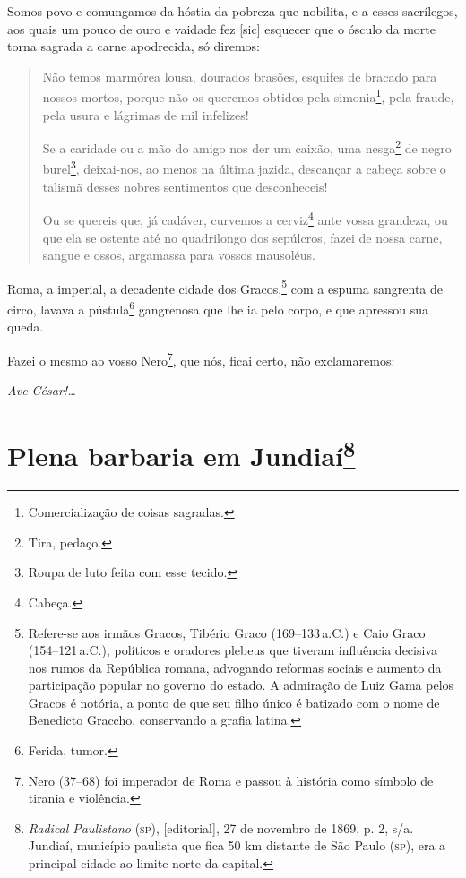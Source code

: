 Somos povo e comungamos da hóstia da pobreza que nobilita, e a esses
sacrílegos, aos quais um pouco de ouro e vaidade fez {[}sic{]} esquecer
que o ósculo da morte torna sagrada a carne apodrecida, só diremos:

\begin{quote}
Não temos marmórea lousa, dourados brasões, esquifes de bracado para
nossos mortos, porque não os queremos obtidos pela simonia\footnote{
  Comercialização de coisas sagradas.}, pela fraude, pela usura e
lágrimas de mil infelizes!

Se a caridade ou a mão do amigo nos der um caixão, uma nesga\footnote{
  Tira, pedaço.} de negro burel\footnote{Roupa de luto feita com esse
  tecido.}, deixai-nos, ao menos na última jazida, descançar a cabeça
sobre o talismã desses nobres sentimentos que desconheceis!

Ou se quereis que, já cadáver, curvemos a cerviz\footnote{Cabeça.}
ante vossa grandeza, ou que ela se ostente até no quadrilongo dos
sepúlcros, fazei de nossa carne, sangue e ossos, argamassa para vossos
mausoléus.
\end{quote}

\noindent\dotfill

Roma, a imperial, a decadente cidade dos Gracos,\footnote{Refere-se aos
  irmãos Gracos, Tibério Graco (169--133\,a.C.) e Caio Graco (154--121\,a.C.), 
  políticos e oradores plebeus que tiveram influência
  decisiva nos rumos da República romana, advogando reformas sociais e
  aumento da participação popular no governo do estado. A admiração de
  Luiz Gama pelos Gracos é notória, a ponto de que seu filho único é
  batizado com o nome de Benedicto Graccho, conservando a grafia latina.\label{graco}}
com a espuma sangrenta de circo, lavava a pústula\footnote{Ferida,
  tumor.} gangrenosa que lhe ia pelo corpo, e que apressou sua queda.

Fazei o mesmo ao vosso Nero\footnote{Nero (37--68) foi imperador de
  Roma e passou à história como símbolo de tirania e violência.}, que
nós, ficai certo, não exclamaremos:

\emph{Ave César!\ldots{}}

\chapter{Plena barbaria em Jundiaí\footnote{\emph{Radical Paulistano}
  (\textsc{sp}), {[}editorial{]}, 27 de novembro de 1869, p. 2, s/a. Jundiaí, município
  paulista que fica 50 km distante de São Paulo (\textsc{sp}), era a principal
  cidade ao limite norte da capital.}}

